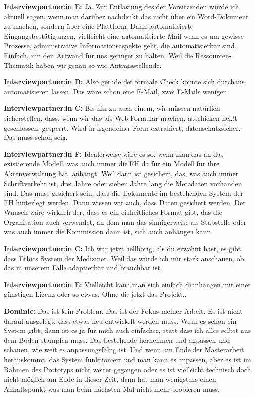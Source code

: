 \documentclass[a4paper,12pt,twoside]{scrreprt}
\begin{document}
\textbf{Interviewpartner:in E:} Ja. Zur Entlastung des:der Vorsitzenden würde ich aktuell sagen, wenn man darüber nachdenkt das nicht über ein Word-Dokument zu machen, sondern über eine Plattform. Dann automatisierte Eingangsbestätigungen, vielleicht eine automatisierte Mail wenn es um gewisse Prozesse, administrative Informationsaspekte geht, die automatisierbar sind. Einfach, um den Aufwand für uns geringer zu halten. Weil die Ressourcen-Thematik haben wir genau so wie Antragsstellende.

\textbf{Interviewpartner:in D:} Also gerade der formale Check könnte sich durchaus automatisieren lassen. Das wäre schon eine E-Mail, zwei E-Mails weniger.

\textbf{Interviewpartner:in C:} Bis hin zu auch einem, wir müssen natürlich sicherstellen, dass, wenn wir das als Web-Formular machen, abschicken heißt geschlossen, gesperrt. Wird in irgendeiner Form extrahiert, datenschutzsicher. Das muss schon sein.

\textbf{Interviewpartner:in F:} Idealerweise wäre es so, wenn man das an das existierende Modell, was auch immer die FH da für ein Modell für ihre Aktenverwaltung hat, anhängt. Weil dann ist gesichert, das, was auch immer Schriftverkehr ist, drei Jahre oder sieben Jahre lang die Metadaten vorhanden sind. Das muss gesichert sein, dass die Dokumente im bestehenden System der FH hinterlegt werden. Dann wissen wir auch, dass Daten gesichert werden. Der Wunsch wäre wirklich der, dass es ein einheitliches Format gibt, das die Organisation auch verwendet, an dem man das sinnigerweise als Stabstelle oder was auch immer die Kommission dann ist, sich auch anhängen kann.

\textbf{Interviewpartner:in C:} Ich war jetzt hellhörig, als du erwähnt hast, es gibt dass Ethics System der Mediziner. Weil das würde ich mir stark anschauen, ob das in unserem Falle adaptierbar und brauchbar ist.

\textbf{Interviewpartner:in E:} Vielleicht kann man sich einfach dranhängen mit einer günstigen Lizenz oder so etwas. Ohne dir jetzt das Projekt..

\textbf{Dominic:} Das ist kein Problem. Das ist der Fokus meiner Arbeit. Es ist nicht darauf ausgelegt, dass etwas neu entwickelt werden muss. Wenn es schon ein System gibt, dann ist es ja für mich auch einfacher, statt dass ich alles selbst aus dem Boden stampfen muss. Das bestehende hernehmen und anpassen und schauen, wie weit es anpassungsfähig ist. Und wenn am Ende der Masterarbeit herauskommt, das System funktioniert und man kann es anpassen, aber es ist im Rahmen des Prototyps nicht weiter gegangen oder es ist vielleicht technisch doch nicht möglich am Ende in dieser Zeit, dann hat man wenigstens einen Anhaltspunkt was man beim nächsten Mal nicht mehr probieren muss.
\end{document}
